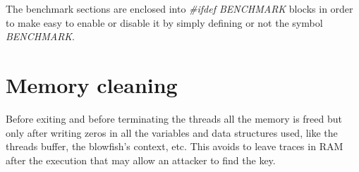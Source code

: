 The benchmark sections are enclosed into \emph{\#ifdef BENCHMARK} blocks in order to make easy to enable or disable it by simply defining or not the symbol \emph{BENCHMARK}.

\section{Memory cleaning}
Before exiting and before terminating the threads all the memory is freed but only after writing zeros in all the variables and data structures used, like the threads buffer, the blowfish's context, etc. This avoids to leave traces in RAM after the execution that may allow an attacker to find the key.